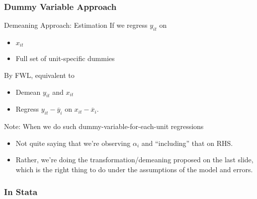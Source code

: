 \documentclass[aspectratio=169, handout]{beamer}
\begin{document}
\subsubsection{Dummy Variable Approach}

{\footnotesize
\begin{frame}{Demeaning Approach: Estimation}
If we regress $y_{it}$ on
\begin{itemize}
  \item $x_{it}$
  \item Full set of unit-specific dummies
\end{itemize}
By FWL, equivalent to
\begin{itemize}
  \item Demean $y_{it}$ and $x_{it}$
  \item Regress
    $y_{it}-\overline{y}_i$
    on
    $x_{it}-\overline{x}_i$.
\end{itemize}
Note:
When we do such dummy-variable-for-each-unit regressions
\begin{itemize}
  \item Not quite saying that we're observing $\alpha_i$ and
    ``including'' that on RHS.
  \item Rather, we're doing the transformation/demeaning proposed on the
    last slide, which is the right thing to do under the assumptions of
    the model and errors.
\end{itemize}
\end{frame}
}


\subsubsection{In Stata}
\end{document}
